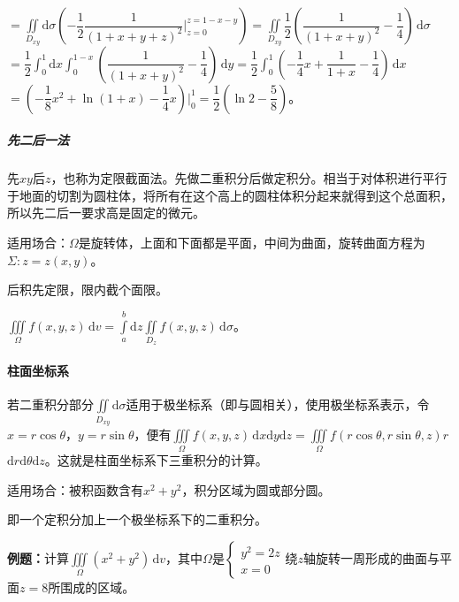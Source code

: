 \documentclass[UTF8, 12pt]{ctexart}
\begin{document}
$=\displaystyle{\iint\limits_{D_{xy}}\textrm{d}\sigma\left(-\dfrac{1}{2}\dfrac{1}{(1+x+y+z)^2}\bigg|_{z=0}^{z=1-x-y}\right)}=\displaystyle{\iint\limits_{D_{xy}}\dfrac{1}{2}\left(\dfrac{1}{(1+x+y)^2}-\dfrac{1}{4}\right)\,\textrm{d}\sigma}$\\$=\dfrac{1}{2}\int_0^1\textrm{d}x\int_0^{1-x}\left(\dfrac{1}{(1+x+y)^2}-\dfrac{1}{4}\right)\,\textrm{d}y=\dfrac{1}{2}\displaystyle{\int_0^1\left(-\dfrac{1}{4}x+\dfrac{1}{1+x}-\dfrac{1}{4}\right)\,\textrm{d}x}$\\$=\left(-\dfrac{1}{8}x^2+\ln(1+x)-\dfrac{1}{4}x\right)\bigg|_0^1=\dfrac{1}{2}\left(\ln2-\dfrac{5}{8}\right)$。

\subparagraph{先二后一法} \leavevmode \medskip

先$xy$后$z$，也称为定限截面法。先做二重积分后做定积分。相当于对体积进行平行于地面的切割为圆柱体，将所有在这个高上的圆柱体积分起来就得到这个总面积，所以先二后一要求高是固定的微元。

适用场合：$\Omega$是旋转体，上面和下面都是平面，中间为曲面，旋转曲面方程为$\Sigma:z=z(x,y)$。

后积先定限，限内截个面限。

$\iiint\limits_\Omega f(x,y,z)\,\textrm{d}v=\int\limits_a^b\textrm{d}z\iint\limits_{D_z}f(x,y,z)\,\textrm{d}\sigma$。

\paragraph{柱面坐标系} \leavevmode \medskip

若二重积分部分$\iint\limits_{D_{xy}}\textrm{d}\sigma$适用于极坐标系（即与圆相关），使用极坐标系表示，令$x=r\cos\theta$，$y=r\sin\theta$，便有$\iiint\limits_\Omega f(x,y,z)\,\textrm{d}x\textrm{d}y\textrm{d}z=\iiint\limits_\Omega f(r\cos\theta,r\sin\theta,z)r\,$\\$\textrm{d}r\textrm{d}\theta\textrm{d}z$。这就是柱面坐标系下三重积分的计算。

适用场合：被积函数含有$x^2+y^2$，积分区域为圆或部分圆。

即一个定积分加上一个极坐标系下的二重积分。


\textbf{例题：}计算$\iiint\limits_\Omega(x^2+y^2)\,\textrm{d}v$，其中$\Omega$是$\left\{\begin{array}{ll}
    y^2=2z \\
    x=0
\end{array}\right.$绕$z$轴旋转一周形成的曲面与平面$z=8$所围成的区域。
\end{document}
